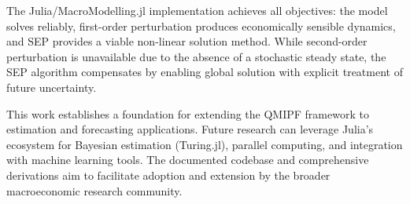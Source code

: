 \documentclass[12pt]{article}
\begin{document}
The Julia/MacroModelling.jl implementation achieves all objectives: the model solves reliably, first-order perturbation produces economically sensible dynamics, and SEP provides a viable non-linear solution method. While second-order perturbation is unavailable due to the absence of a stochastic steady state, the SEP algorithm compensates by enabling global solution with explicit treatment of future uncertainty.

This work establishes a foundation for extending the QMIPF framework to estimation and forecasting applications. Future research can leverage Julia's ecosystem for Bayesian estimation (Turing.jl), parallel computing, and integration with machine learning tools. The documented codebase and comprehensive derivations aim to facilitate adoption and extension by the broader macroeconomic research community.
\end{document}
